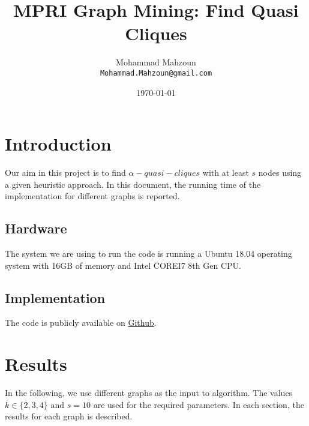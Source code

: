 \documentclass{article}
\title{MPRI Graph Mining: Find Quasi Cliques}
\author{Mohammad Mahzoun\\ \texttt{Mohammad.Mahzoun@gmail.com}} %
\date{\today} %
\begin{document}
\maketitle %


\section{Introduction} %
Our aim in this project is to find $\alpha-quasi-cliques$ with at least $s$ nodes using a given heuristic approach. In this document, the running time of the implementation for different graphs is reported. 

\subsection{Hardware}
The system we are using to run the code is running a Ubuntu 18.04 operating system with 16GB of memory and Intel COREI7 8th Gen CPU. 


\subsection{Implementation} %
The code is publicly available on \href{https://github.com/mahzoun/MPRIGraphMining}{Github}.


\section{Results}
In the following, we use different graphs as the input to algorithm. The values $k \in \{2, 3, 4\}$ and $s = 10$ are used for the required parameters. In each section, the results for each graph is described. 

	
\end{document}
